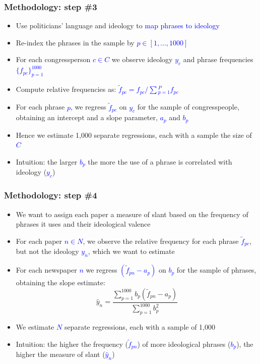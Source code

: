 \documentclass[english]{beamer}
\begin{document}
\begin{frame}
\frametitle{Methodology: step \#3}
\begin{itemize}
\setlength{\itemsep}{0.8em}

\item{Use politicians' language and ideology to \textcolor{blue}{map phrases to ideology}}
\pause
\item{Re-index the phrases in the sample by \textcolor{blue}{$p \in [1,...,1000]$}}
\pause
\item{For each congressperson \textcolor{blue}{$c \in C$} we observe ideology \textcolor{blue}{$y_c$} and phrase frequencies \textcolor{blue}{$\{f_{pc}\}_{p=1}^{1000}$}}
\pause
\item{Compute relative frequencies as: \textcolor{blue}{$\tilde{f}_{pc}=f_{pc}/\sum{}_{p=1}^{P}f_{pc}$}}
\pause
\item{For each phrase \textcolor{blue}{$p$}, we regress \textcolor{blue}{$\tilde{f}_{pc}$} on \textcolor{blue}{$y_c$} for the sample of congresspeople, obtaining an intercept and a slope parameter, \textcolor{blue}{$a_p$} and  \textcolor{blue}{$b_p$}}
\pause
\item{Hence we estimate 1,000 separate regressions, each with a sample the size of \textcolor{blue}{$C$}}

\item{Intuition: the larger \textcolor{blue}{$b_p$} the more the use of a phrase is correlated with ideology (\textcolor{blue}{$y_c$})}
\end{itemize}
\end{frame}

\begin{frame}
\frametitle{Methodology: step \#4}
\begin{itemize}
\setlength{\itemsep}{0.8em}
\item{We want to assign each paper a measure of slant based on the frequency  of phrases it uses and their ideological valence}
\pause
\item{For each paper \textcolor{blue}{$n \in N$}, we observe the relative frequency for each phrase  \textcolor{blue}{$\tilde{f}_{pc}$}, but not the ideology  \textcolor{blue}{$y_n$}, which we want to estimate}
\pause
\item{For each newspaper  \textcolor{blue}{$n$} we regress \textcolor{blue}{$(\tilde{f}_{pn}-a_p)$} on \textcolor{blue}{$b_p$} for the sample of phrases, obtaining the slope estimate:
$$ \hat{y}_n =  \frac{
\sum_{p=1}^{1000}b_p(\tilde{f}_{pn}-a_p) 
}{\sum_{p=1}^{1000}b_p^2}$$
}
\pause
\item{We estimate \textcolor{blue}{$N$} separate regressions, each with a sample of 1,000}
\pause
\item{Intuition: the higher the frequency (\textcolor{blue}{$\tilde{f}_{pn}$}) of more ideological phrases (\textcolor{blue}{$b_p$}), the higher the measure of slant (\textcolor{blue}{$\hat{y}_n$})}
\end{itemize}
\end{frame}
\end{document}

